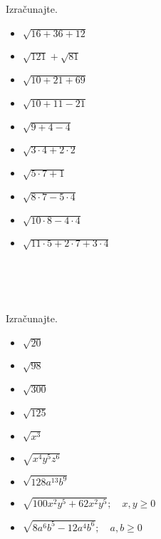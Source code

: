 \begin{multicols}{2}
        
            \begin{naloga}
                Izračunajte.
                \begin{itemize}
                        \item $\sqrt{16+36+12}$ 
                        \item $\sqrt{121}+\sqrt{81}$ 
                        \item $\sqrt{10+21+69}$ 
                        \item $\sqrt{10+11-21}$ 
                        \item $\sqrt{9+4-4}$ 
                        \item $\sqrt{3\cdot 4+2\cdot 2}$ 
                        \item $\sqrt{5\cdot 7 +1}$ 
                        \item $\sqrt{8\cdot 7-5\cdot 4}$ 
                        \item $\sqrt{10\cdot 8-4\cdot 4}$ 
                        \item $\sqrt{11\cdot 5+2\cdot 7+3\cdot 4}$ 
                \end{itemize}
            \end{naloga}
        
            ~~\\~~\\~~\\
        
            \begin{naloga}
                Izračunajte.
                \begin{itemize}
                        \item $\sqrt{20}$ 
                        \item $\sqrt{98}$ 
                        \item $\sqrt{300}$ 
                        \item $\sqrt{125}$ 
                        \item $\sqrt{x^3}$ 
                        \item $\sqrt{x^4y^5z^6}$ 
                        \item $\sqrt{128a^{13}b^9}$ 
                        \item $\sqrt{100x^2y^5+62x^2y^5}; \quad x,y\geq 0$ 
                        \item $\sqrt{8a^6b^5-12a^4b^6}; \quad a,b\geq 0$ 
                \end{itemize}
            \end{naloga}
        



\end{multicols}
